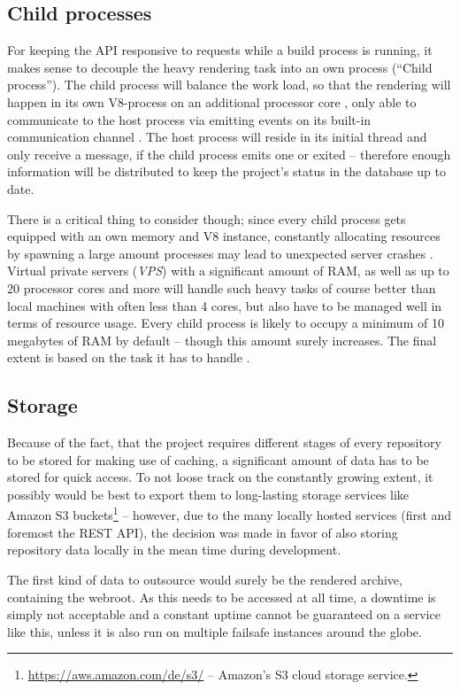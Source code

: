 \subsection{Child processes}
For keeping the API responsive to requests while a build process is running, it makes sense to decouple the heavy rendering task into an own process (``Child process''). The child process will balance the work load, so that the rendering will happen in its own V8-process on an additional processor core \cite[335]{cantelon2017node}, only able to communicate to the host process via emitting events on its built-in communication channel \cite{NodejsChildProcesses}. The host process will reside in its initial thread and only receive a message, if the child process emits one or exited -- therefore enough information will be distributed to keep the project's status in the database up to date.

There is a critical thing to consider though; since every child process gets equipped with an own memory and V8 instance, constantly allocating resources by spawning a large amount processes may lead to unexpected server crashes \cite{NodejsChildProcesses}. Virtual private servers (\emph{VPS}) with a significant amount of RAM, as well as up to 20 processor cores and more will handle such heavy tasks of course better than local machines with often less than 4 cores, but also have to be managed well in terms of resource usage. Every child process is likely to occupy a minimum of 10 megabytes of RAM by default -- though this amount surely increases. The final extent is based on the task it has to handle \cite{RobinsonNodeCluster}.

\subsection{Storage}
Because of the fact, that the project requires different stages of every repository to be stored for making use of caching, a significant amount of data has to be stored for quick access. To not loose track on the constantly growing extent, it possibly would be best to export them to long-lasting storage services like Amazon S3 buckets\footnote{\url{https://aws.amazon.com/de/s3/} -- Amazon's S3 cloud storage service.} -- however, due to the many locally hosted services (first and foremost the REST API), the decision was made in favor of also storing repository data locally in the mean time during development.

The first kind of data to outsource would surely be the rendered archive, containing the webroot. As this needs to be accessed at all time, a downtime is simply not acceptable and a constant uptime cannot be guaranteed on a service like this, unless it is also run on multiple failsafe instances around the globe.

